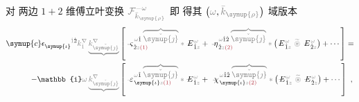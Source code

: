 对  两边 $1+2$ 维傅立叶变换 $\mathcolor{gray}{\mathcal F_{\bar{k}_{\symup{\rho}}}^{-\omega}}$ 即  得其 $\left( \mathcolor{gray}{\omega}, \mathcolor{gray}{\bar{k}_{\symup{\rho}}} \right)$ 域版本
\begin{subequations}
\begin{align}
	{\symup{c}} \epsilon^{\hphantom{\symup{\iota}}\mathcolor{gray}{\dot{1}}\dot{2}}_{\symup{\iota}} \mathcolor{gray}{k^\nabla_{\dot{1}}} \mathcolor{gray}{\underbrace{k^\nabla_{\check{\symup{\jmath}}}}} &\left[ \Xint{\begin{smallmatrix} ~ \\ {}^{}_{\mathcolor{gray}{-}} \\ ~ \end{smallmatrix}}{13}{\varsigma}^{\;\! \mathcolor{gray}{\omega} \hat{1} \;\! \mathcolor{gray}{\overbrace{\check{\symup{\jmath}}}}}_{\;\! \dot{2} \mathcolor{gray}{z} \textcolor{Maroon}{(1)}} \mathcolor{gray}{*} \Xint{\mathcolor{gray}{-}}{295}{E}^{\;\!\mathcolor{gray}{\omega}}_{\;\! \hat{1} \mathcolor{gray}{z}} + \Xint{\begin{smallmatrix} ~ \\ {}^{}_{\mathcolor{gray}{-}} \\ ~ \end{smallmatrix}}{17}{\eta}^{\;\! \mathcolor{gray}{\omega} \hat{1} \hat{2} \;\! \mathcolor{gray}{\overbrace{\check{\symup{\jmath}}}}}_{\;\! \dot{2} \mathcolor{gray}{z} \textcolor{Maroon}{(2)}} \mathcolor{gray}{*} \left( \Xint{\mathcolor{gray}{-}}{295}{E}^{\;\!\mathcolor{gray}{\omega}}_{\;\! \hat{1} \mathcolor{gray}{z}} ~\mathcolor{gray}{\widetilde \circledast}~ \Xint{\mathcolor{gray}{-}}{295}{E}^{\;\!\mathcolor{gray}{\omega}}_{\;\! \hat{2} \mathcolor{gray}{z}} \right) + \cdots \right] \label{eq:wave_wkrho} = \\
	- \mathbb{i} \mathcolor{gray}{\omega} \mathcolor{gray}{\underbrace{k^\nabla_{\check{\symup{\jmath}}}}} &\left[ \Xint{\begin{smallmatrix} ~ \\ {}^{}_{\mathcolor{gray}{-}} \\ ~ \end{smallmatrix}}{16}{\varepsilon}^{\;\! \mathcolor{gray}{\omega} \hat{1} \;\! \mathcolor{gray}{\overbrace{\check{\symup{\jmath}}}}}_{\;\! \symup{\iota} \mathcolor{gray}{z} \textcolor{Maroon}{(1)}} \mathcolor{gray}{*} \Xint{\mathcolor{gray}{-}}{295}{E}^{\;\!\mathcolor{gray}{\omega}}_{\;\! \hat{1} \mathcolor{gray}{z}} + ~\Xint{{}^{}_{\mathcolor{gray}{-}}}{23}{\chi}^{\;\! \mathcolor{gray}{\omega} \hat{1} \hat{2} \;\! \mathcolor{gray}{\overbrace{\check{\symup{\jmath}}}}}_{\;\! \symup{\iota} \mathcolor{gray}{z} \textcolor{Maroon}{(2)}} \mathcolor{gray}{*} \left( \Xint{\mathcolor{gray}{-}}{295}{E}^{\;\!\mathcolor{gray}{\omega}}_{\;\! \hat{1} \mathcolor{gray}{z}} ~\mathcolor{gray}{\widetilde \circledast}~ \Xint{\mathcolor{gray}{-}}{295}{E}^{\;\!\mathcolor{gray}{\omega}}_{\;\! \hat{2} \mathcolor{gray}{z}} \right) + \cdots \right]~,
\end{align}
\end{subequations}
